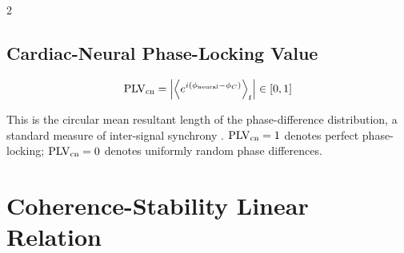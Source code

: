 \begin{multicols}{2}
\subsection{Cardiac-Neural Phase-Locking Value}

\begin{definition}
\begin{equation}
\mathrm{PLV}_{\mathrm{cn}} = \left|\left\langle e^{i(\phi_{\mathrm{neural}} - \phi_C)}\right\rangle_t\right| \in [0,1]
\end{equation}
\end{definition}

This is the circular mean resultant length of the phase-difference distribution, a standard measure of inter-signal synchrony \citep{lachaux1999measuring}. $\mathrm{PLV}_{\mathrm{cn}} = 1$ denotes perfect phase-locking; $\mathrm{PLV}_{\mathrm{cn}} = 0$ denotes uniformly random phase differences.

\end{multicols}

\section{Coherence-Stability Linear Relation}

